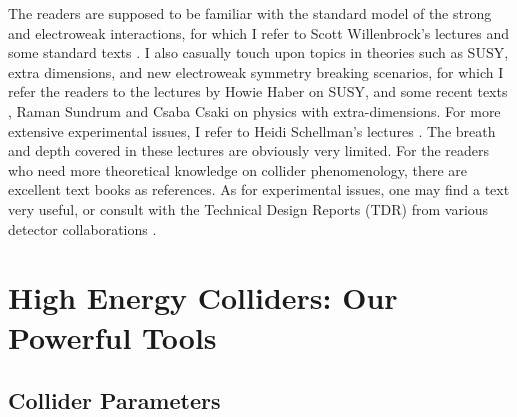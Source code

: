 \documentclass[prd,aps,floats,preprintnumbers,preprint,superscriptaddress,floatfix,nofootinbib]{revtex4}
\begin{document}
The readers are supposed to be familiar with the standard model of the
strong and electroweak interactions, 
for which I refer to Scott Willenbrock's lectures \cite{scott-sm}
and some standard texts \cite{books-sm}. 
I also casually touch upon topics in theories such as SUSY, 
extra dimensions, and new electroweak
symmetry breaking scenarios, for which I refer the readers to the 
lectures by Howie Haber \cite{howie-susy,PDG} on SUSY, and some recent 
texts \cite{books-susy}, 
Raman Sundrum \cite{raman-extrad} and Csaba Csaki \cite{csaba-higgs}
on physics with extra-dimensions. 
For more extensive experimental issues, 
I refer to Heidi Schellman's lectures \cite{exp}. 
The breath and depth covered in these lectures are obviously very limited.
For the readers who need more theoretical knowledge  on collider phenomenology,
there are excellent text books \cite{bp,esw} as references.
As for experimental issues, one may find a text \cite{book-exp} very
useful, or consult with the Technical Design Reports
(TDR) from various detector collaborations \cite{ATLAS,CMS,ILC}.

\section{High Energy Colliders: Our Powerful Tools}
\label{collider}

\subsection{ Collider Parameters}
\end{document}
